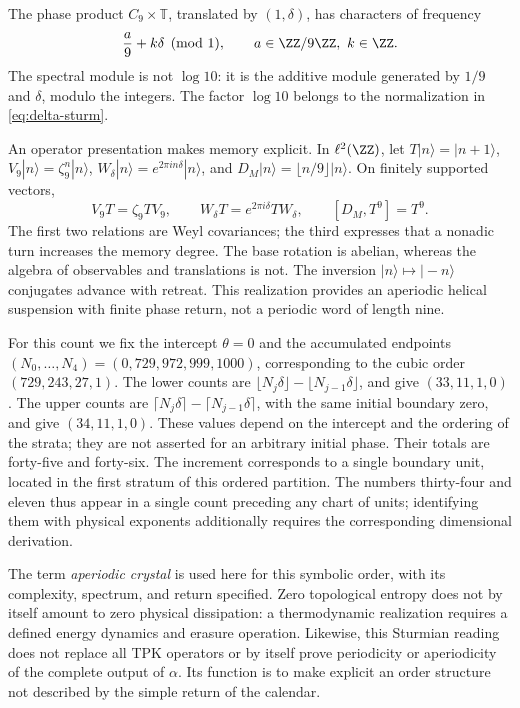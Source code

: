 The phase product \(C_9\times\mathbb T\), translated by \((1,\delta)\), has characters of frequency
\[
 \frac a9+k\delta\pmod1,\qquad a\in\ZZ/9\ZZ,\ k\in\ZZ.
\]
The spectral module is not \(\log10\): it is the additive module generated by \(1/9\) and \(\delta\), modulo the integers. The factor \(\log10\) belongs to the normalization in \eqref{eq:delta-sturm}.

An operator presentation makes memory explicit. In \(\ell^2(\ZZ)\), let \(T|n\rangle=|n+1\rangle\), \(V_9|n\rangle=\zeta_9^n|n\rangle\), \(W_\delta|n\rangle=e^{2\pi i n\delta}|n\rangle\), and \(D_M|n\rangle=\lfloor n/9\rfloor|n\rangle\). On finitely supported vectors,
\begin{equation}
 V_9T=\zeta_9TV_9,\qquad
 W_\delta T=e^{2\pi i\delta}TW_\delta,\qquad
 [D_M,T^9]=T^9.
 \label{eq:weyl-relojes}
\end{equation}
The first two relations are Weyl covariances; the third expresses that a nonadic turn increases the memory degree. The base rotation is abelian, whereas the algebra of observables and translations is not. The inversion \(|n\rangle\mapsto|-n\rangle\) conjugates advance with retreat. This realization provides an aperiodic helical suspension with finite phase return, not a periodic word of length nine.



For this count we fix the intercept \(\theta=0\) and the accumulated endpoints \((N_0,\ldots,N_4)=(0,729,972,999,1000)\), corresponding to the cubic order \((729,243,27,1)\). The lower counts are \(\lfloor N_j\delta\rfloor-\lfloor N_{j-1}\delta\rfloor\), and give \((33,11,1,0)\). The upper counts are \(\lceil N_j\delta\rceil-\lceil N_{j-1}\delta\rceil\), with the same initial boundary zero, and give \((34,11,1,0)\). These values depend on the intercept and the ordering of the strata; they are not asserted for an arbitrary initial phase. Their totals are forty-five and forty-six. The increment corresponds to a single boundary unit, located in the first stratum of this ordered partition. The numbers thirty-four and eleven thus appear in a single count preceding any chart of units; identifying them with physical exponents additionally requires the corresponding dimensional derivation.

The term \emph{aperiodic crystal} is used here for this symbolic order, with its complexity, spectrum, and return specified. Zero topological entropy does not by itself amount to zero physical dissipation: a thermodynamic realization requires a defined energy dynamics and erasure operation. Likewise, this Sturmian reading does not replace all TPK operators or by itself prove periodicity or aperiodicity of the complete output of \(\alpha\). Its function is to make explicit an order structure not described by the simple return of the calendar.




